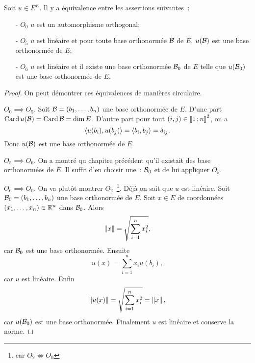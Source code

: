 \begin{theo}
  Soit \(u \in E^E\). Il y a équivalence entre les assertions suivantes~:
  \begin{enumerate}
    \item[- \(O_0\)] \(u\) est un automorphisme orthogonal;
    \item[- \(O_5\)] \(u\) est linéaire et pour toute base orthonormée \(\mathcal{B}\) de 
      \(E\), \(u(\mathcal{B})\) est une base orthonormée de \(E\);
    \item[- \(O_6\)] \(u\) est linéaire et il existe une base orthonormée 
      \(\mathcal{B}_0\) de \(E\) telle que \(u(\mathcal{B}_0)\) est une base orthonormée de \(E\).
  \end{enumerate}
\end{theo}
\begin{proof}
  On peut démontrer ces équivalences de manières circulaire.

  \(O_0 \implies O_5\). Soit \(\mathcal{B}=(b_1, \dotsc, b_n)\) une base orthonormée de 
  \(E\). D'une part \(\operatorname{Card} u(\mathcal{B})=\operatorname{Card} \mathcal{B}=\operatorname{dim} E\). D'autre part pour tout 
  \((i,j) \in \mathopen{\llbracket}1\mathclose{}\mathpunct{};n\mathclose{\rrbracket}^2\), on a
  \begin{equation}
    \left\langle{u(b_i)},{u(b_j)}\right\rangle=\left\langle{b_i},{b_j}\right\rangle=\delta_{ij}.
  \end{equation}
  Donc \(u(\mathcal{B})\) est une base orthonormée de \(E\).

  \(O_5 \implies O_6\). On a montré qu chapitre précédent qu'il existait des 
  base orthonormées de \(E\). Il suffit d'en choisir une~: \(\mathcal{B}_0\) et de lui 
  appliquer \(O_5\).

  \(O_6 \implies O_0\). On va plutôt montrer \(O_2\)~\footnote{car \(O_2 \iff 
  O_0\)}. Déjà on sait que \(u\) est linéaire. Soit \(\mathcal{B}_0 = (b_1, \dotsc, 
  b_n)\) une base orthonormée de \(E\). Soit \(x \in E\) de coordonnées \((x_1, 
  \dotsc, x_n) \in \mathbb{R}^n\) dans \(\mathcal{B}_0\). Alors
  \begin{equation}
    \left\lVert x\right\rVert = \sqrt{\sum_{i=1}^n x_i^2},
  \end{equation}
  car \(\mathcal{B}_0\) est une base orthonormée. Ensuite
  \begin{equation}
    u(x) = \sum_{i=1}^n x_i u(b_i),
  \end{equation}
  car \(u\) est linéaire. Enfin
  \begin{equation}
    \left\lVert u(x)\right\rVert = \sqrt{\sum_{i=1}^n x_i^2}=\left\lVert x\right\rVert,
  \end{equation}
  car \(u(\mathcal{B}_0)\) est une base orthonormée. Finalement \(u\) est linéaire et 
  conserve la norme.
\end{proof}
